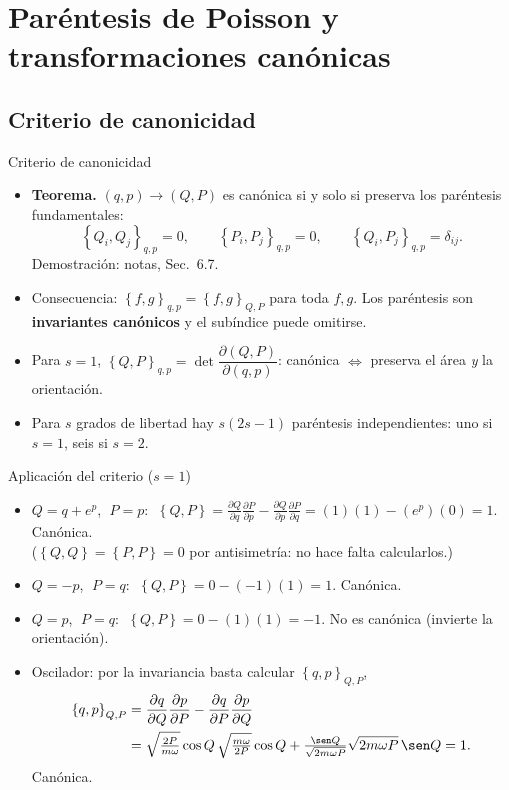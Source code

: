 \documentclass[spanish]{beamer}
\newcommand{\pd}[2]{\frac{\partial #1}{\partial #2}}
\newcommand{\pb}[2]{\left\{#1,#2\right\}}    %
\begin{document}
\section{Paréntesis de Poisson y transformaciones canónicas}

\subsection{Criterio de canonicidad}
\begin{frame}{Criterio de canonicidad}
\begin{itemize}[<+->]
  \item \textbf{Teorema.} $(q,p)\to(Q,P)$ es canónica si y solo si preserva los
        paréntesis fundamentales:
        \[
          \pb{Q_i}{Q_j}_{q,p}=0,\qquad\pb{P_i}{P_j}_{q,p}=0,\qquad
          \pb{Q_i}{P_j}_{q,p}=\delta_{ij}.
        \]
        Demostración: notas, Sec.~6.7.
  \item Consecuencia: $\pb{f}{g}_{q,p}=\pb{f}{g}_{Q,P}$ para toda $f,g$. Los paréntesis
        son \textbf{invariantes canónicos} y el subíndice puede omitirse.
  \item Para $s=1$, $\pb{Q}{P}_{q,p}=\det\dfrac{\partial(Q,P)}{\partial(q,p)}$:
        canónica $\iff$ preserva el área \emph{y} la orientación.
  \item Para $s$ grados de libertad hay $s(2s-1)$ paréntesis independientes:
        uno si $s=1$, seis si $s=2$.
\end{itemize}
\end{frame}

\begin{frame}{Aplicación del criterio ($s=1$)}
\begin{itemize}[<+->]
  \item $Q=q+e^p$, $\;P=p$:
        $\;\pb{Q}{P}=\pd{Q}{q}\pd{P}{p}-\pd{Q}{p}\pd{P}{q}=(1)(1)-(e^p)(0)=1$. Canónica.
        \\{\small($\pb{Q}{Q}=\pb{P}{P}=0$ por antisimetría: no hace falta calcularlos.)}
  \item $Q=-p$, $\;P=q$: $\;\pb{Q}{P}=0-(-1)(1)=1$. Canónica.
  \item $Q=p$, $\;P=q$: $\;\pb{Q}{P}=0-(1)(1)=-1$. No es canónica
        (invierte la orientación).
  \item Oscilador: por la invariancia basta calcular $\pb{q}{p}_{Q,P}$,
        \begin{align*}
          \pb{q}{p}_{Q,P}&=\pd{q}{Q}\pd{p}{P}-\pd{q}{P}\pd{p}{Q}\\
          &=\sqrt{\tfrac{2P}{m\omega}}\cos Q\,\sqrt{\tfrac{m\omega}{2P}}\cos Q
          +\tfrac{\sen Q}{\sqrt{2m\omega P}}\sqrt{2m\omega P}\,\sen Q=1 .
        \end{align*}
        Canónica.
\end{itemize}
\end{frame}
\end{document}
